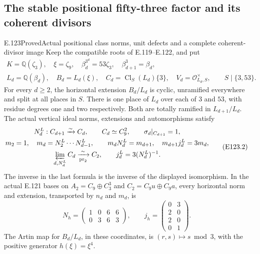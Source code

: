 \subsection{The stable positional fifty-three factor and its coherent divisors}

\begin{statement}{E.123}{Proved}{Actual positional class norms, unit defects and a complete coherent-divisor image}
Keep the compatible roots of E.119--E.122, and put
\[
 \begin{gathered}
 K=\mathbb Q(\zeta_3),\quad \xi=\zeta_9,\quad
 \beta_d^{3^d}=53\zeta_3,\quad \beta_{d+1}^3=\beta_d,\\
 L_d=\mathbb Q(\beta_d),\quad B_d=L_d(\xi),\quad
 C_d=\operatorname{Cl}_S(L_d)\{3\},\quad
 V_d=\mathcal O_{L_d,S}^{\times},\qquad S\mid\{3,53\}.
 \end{gathered}
 \tag{E123.1}
\]
For every $d\ge2$, the horizontal extension $B_d/L_d$ is cyclic,
unramified everywhere and split at all places in $S$. There is one
place of $L_d$ over each of $3$ and $53$, with residue degrees one
and two respectively. Both are totally ramified in $L_{d+1}/L_d$.
The actual vertical ideal norms, extensions and automorphisms satisfy
\[
 \begin{gathered}
 N_d^L:C_{d+1}\xrightarrow{\sim}C_d,\qquad
 C_d\simeq C_9^2,\qquad \sigma_d|_{C_{d+1}}=1,\\
 m_2=1,\quad m_d=N_2^L\cdots N_{d-1}^L,\qquad
 m_dN_d^L=m_{d+1},\quad m_{d+1}j_d^L=3m_d,\\
 \varprojlim_{d,N_d^L}C_d\xrightarrow[\mathrm{pr}_2]{\sim}C_2,
 \qquad j_d^L=3(N_d^L)^{-1}.
 \end{gathered}
 \tag{E123.2}
\]
The inverse in the last formula is the inverse of the displayed
isomorphism. In the actual E.121 bases on $A_2=C_9\oplus C_3^3$
and $C_2=C_9u\oplus C_9a$, every horizontal norm and extension,
transported by $n_d$ and $m_d$, is
\[
 N_h=\begin{pmatrix}1&0&6&6\\0&3&6&3\end{pmatrix},
 \qquad
 j_h=\begin{pmatrix}0&3\\2&0\\2&0\\0&1\end{pmatrix}.
 \tag{E123.3}
\]
The Artin map for $B_d/L_d$, in these coordinates, is
$(r,s)\mapsto s\bmod3$, with the positive generator
$h(\xi)=\xi^4$.


\end{statement}
